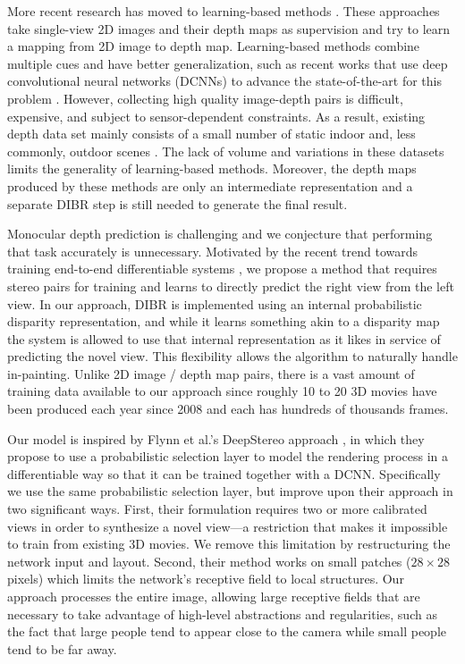 \documentclass[runningheads]{llncs}
\begin{document}
More recent research has moved to learning-based methods \cite{zhang20113d,konrad2013learning,appia2014fully,saxena2009make3d,baig2014im2depth}.
These approaches take single-view 2D images and their depth maps as supervision and try to learn a mapping from 2D image to depth map.
Learning-based methods combine multiple cues and have better generalization, such as recent works that use deep convolutional neural networks (DCNNs) to advance the state-of-the-art for this problem \cite{eigen2014depth,liu2015deep}.
However, collecting high quality image-depth pairs is difficult, expensive, and subject to sensor-dependent constraints.
As a result, existing depth data set mainly consists of a small number of static indoor and, less commonly, outdoor scenes \cite{Silberman:ECCV12,Geiger2013IJRR}.
The lack of volume and variations in these datasets limits the generality of learning-based methods.
Moreover, the depth maps produced by these methods are only an intermediate representation and a separate DIBR step is still needed to generate the final result.

Monocular depth prediction is challenging and we conjecture that performing that task accurately is unnecessary.
Motivated by the recent trend towards training end-to-end differentiable systems \cite{zheng2015conditional,levine2015end}, we propose a method that requires stereo pairs for training and learns to directly predict the right view from the left view.
In our approach, DIBR is implemented using
an internal probabilistic disparity representation,
and while it learns something akin to a disparity map the system is allowed to use that internal representation as it likes in service of predicting the novel view.
This flexibility allows the algorithm to naturally handle in-painting.
Unlike 2D image / depth map pairs, there is a vast amount of training data available to our approach since roughly 10 to 20 3D movies have been produced each year since 2008 and each has hundreds of thousands frames.

Our model is inspired by Flynn et al.'s DeepStereo approach \cite{flynn2015deepstereo}, in which they propose to use a probabilistic selection layer to model the rendering process in a differentiable way so that it can be trained together with a DCNN.
Specifically we use the same probabilistic selection layer, but improve upon their approach in two significant ways.
First, their formulation requires two or more calibrated views in order to synthesize a novel view---a restriction that makes it impossible to train from existing 3D movies.
We remove this limitation by restructuring the network input and layout.
Second, their method works on small patches ($28 \times 28$ pixels) which limits the network's receptive field to local structures.
Our approach processes the entire image, allowing large receptive fields that are necessary to take advantage of high-level abstractions and regularities, such as the fact that large people tend to appear close to the camera while small people tend to be far away.
\end{document}
